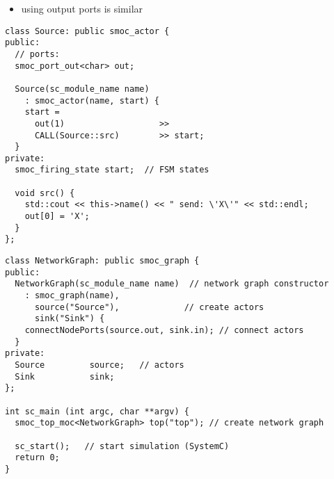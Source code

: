 \begin{frame}[fragile=singleslide]
\begin{itemize}
\item using output ports is similar
\end{itemize}
\begin{lstlisting}
class Source: public smoc_actor {
public:
  // ports:
  smoc_port_out<char> out;

  Source(sc_module_name name)
    : smoc_actor(name, start) {
    start = 
      out(1)                   >>
      CALL(Source::src)        >> start;
  }
private:
  smoc_firing_state start;  // FSM states

  void src() {
    std::cout << this->name() << " send: \'X\'" << std::endl;
    out[0] = 'X';
  }
};
\end{lstlisting}
\end{frame}




\begin{frame}[fragile=singleslide]
\begin{lstlisting}
class NetworkGraph: public smoc_graph {
public:
  NetworkGraph(sc_module_name name)  // network graph constructor
    : smoc_graph(name),
      source("Source"),             // create actors
      sink("Sink") {
    connectNodePorts(source.out, sink.in); // connect actors
  }
private:
  Source         source;   // actors
  Sink           sink;
};

int sc_main (int argc, char **argv) {
  smoc_top_moc<NetworkGraph> top("top"); // create network graph

  sc_start();   // start simulation (SystemC)
  return 0;
}
\end{lstlisting}
\end{frame}




